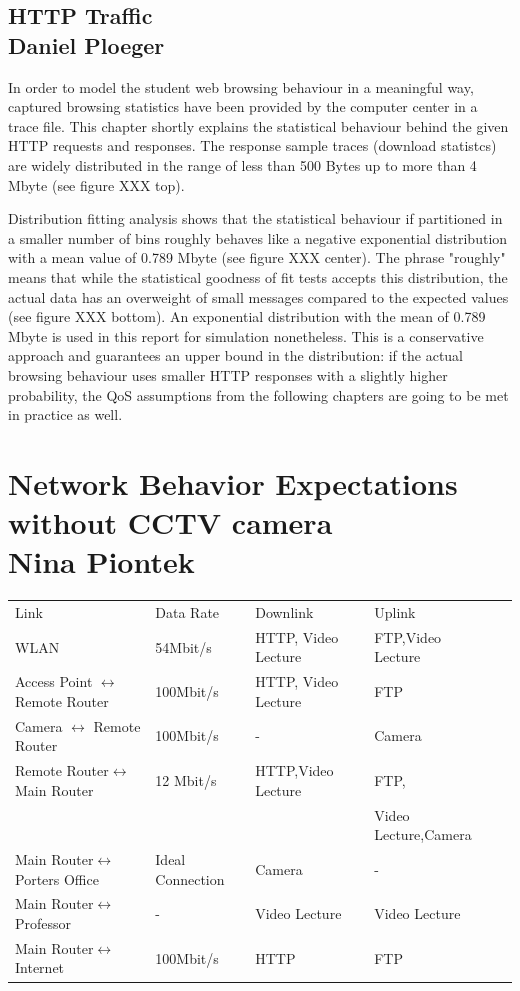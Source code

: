 \documentclass[a4paper,10pt]{book}\usepackage{graphicx}
\begin{document}
\subsection{HTTP Traffic\\ {\large Daniel Ploeger}}
\label{chapter_http_traffic}
In order to model the student web browsing behaviour in 
a meaningful way, captured browsing statistics have been provided by the computer center in a trace file. 
This chapter shortly explains the statistical behaviour behind the given HTTP 
requests and responses. The response sample traces (download statistcs) are widely 
distributed in the range of less than 500 Bytes up to more than 4 Mbyte 
(see figure XXX top).

Distribution fitting analysis shows that the statistical behaviour if
 partitioned in a smaller number of bins roughly behaves like a negative 
exponential distribution with a mean value of 0.789 Mbyte (see figure XXX center). 
The phrase "roughly" means that while the statistical goodness of fit tests accepts
 this distribution, the actual data has an overweight of small messages compared to
 the expected values (see figure XXX bottom). An exponential distribution with the
 mean of 0.789 Mbyte is used in this report for simulation nonetheless. 
This is a conservative approach and guarantees an upper bound in the distribution:
 if the actual browsing behaviour uses smaller HTTP responses with a slightly higher
 probability, the QoS assumptions from the following chapters are going to be met 
in practice as well.
\section{Network Behavior  Expectations without CCTV camera\\ {\large Nina Piontek}}

\begin{minipage}[t]{0.5\textwidth}
\begin{tabular}{|l|l|l|l|l|}
\cline{1-4}
 Link & Data Rate  & Downlink  & Uplink  \\ \cline{1-4}
 WLAN & 54Mbit/s  & HTTP, Video Lecture & FTP,Video Lecture \\ \cline{1-4}
 Access Point $\leftrightarrow$ Remote Router & 100Mbit/s  &HTTP, Video Lecture& FTP  \\ \cline{1-4}
 Camera $\leftrightarrow$ Remote Router & 100Mbit/s  & - & Camera\\ \cline{1-4}
 Remote Router$\leftrightarrow$Main Router&12 Mbit/s&HTTP,Video Lecture& FTP, \\ 
 & & & Video Lecture,Camera \\ \cline{1-4}
 Main Router$\leftrightarrow $ Porters Office &Ideal Connection &Camera& - \\ \cline{1-4}
 Main Router$\leftrightarrow $ Professor & -  &Video Lecture&Video Lecture \\ \cline{1-4}
 Main Router$\leftrightarrow $ Internet &100Mbit/s &HTTP& FTP \\ \cline{1-4}
\end{tabular}
\end{minipage}
\end{document}
